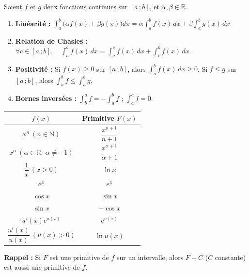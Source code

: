 \documentclass[11pt]{article}
\begin{document}
\begin{propriete}
Soient $f$ et $g$ deux fonctions continues sur $[a\,;b]$, et $\alpha, \beta \in \mathbb{R}$.
\begin{enumerate}
\item \textbf{Linéarité :} $\displaystyle\int_a^b \big(\alpha f(x) + \beta g(x)\big)dx = \alpha\int_a^b f(x)\,dx + \beta\int_a^b g(x)\,dx$.
\item \textbf{Relation de Chasles :} $\forall c \in [a\,;b],\quad \displaystyle\int_a^b f(x)\,dx = \int_a^c f(x)\,dx + \int_c^b f(x)\,dx$.
\item \textbf{Positivité :} Si $f(x) \geq 0$ sur $[a\,;b]$, alors $\displaystyle\int_a^b f(x)\,dx \geq 0$. Si $f \leq g$ sur $[a\,;b]$, alors $\displaystyle\int_a^b f \leq \int_a^b g$.
\item \textbf{Bornes inversées :} $\displaystyle\int_b^a f = -\int_a^b f$ ; $\displaystyle\int_a^a f = 0$.
\end{enumerate}
\end{propriete}

\begin{aretenir}
\begin{center}
\begin{tabular}{|c|c|}\hline
$f(x)$ & Primitive $F(x)$ \\ \hline
$x^n\ (n\in\mathbb{N})$ & $\dfrac{x^{n+1}}{n+1}$ \\
$x^\alpha\ (\alpha\in\mathbb{R},\ \alpha\neq -1)$ & $\dfrac{x^{\alpha+1}}{\alpha+1}$ \\
$\dfrac{1}{x}\ (x>0)$ & $\ln x$ \\
$e^x$ & $e^x$ \\
$\cos x$ & $\sin x$ \\
$\sin x$ & $-\cos x$ \\
$u'(x)e^{u(x)}$ & $e^{u(x)}$ \\
$\dfrac{u'(x)}{u(x)}\ (u(x)>0)$ & $\ln u(x)$ \\ \hline
\end{tabular}
\end{center}
\textbf{Rappel :} Si $F$ est une primitive de $f$ sur un intervalle, alors $F + C$ ($C$ constante) est aussi une primitive de $f$.
\end{aretenir}
\end{document}
